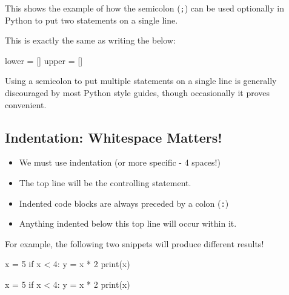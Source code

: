\documentclass[
  letterpaper,
  DIV=11,
  numbers=noendperiod]{scrartcl}
\newenvironment{Shaded}{\begin{snugshade}}{\end{snugshade}}
\newcommand{\BuiltInTok}[1]{\textcolor[rgb]{0.00,0.23,0.31}{#1}}
\newcommand{\ControlFlowTok}[1]{\textcolor[rgb]{0.00,0.23,0.31}{#1}}
\newcommand{\DecValTok}[1]{\textcolor[rgb]{0.68,0.00,0.00}{#1}}
\newcommand{\NormalTok}[1]{\textcolor[rgb]{0.00,0.23,0.31}{#1}}
\newcommand{\OperatorTok}[1]{\textcolor[rgb]{0.37,0.37,0.37}{#1}}
\begin{document}
This shows the example of how the semicolon (\texttt{;}) can be used
optionally in Python to put two statements on a single line.

This is exactly the same as writing the below:

\begin{Shaded}
\begin{Highlighting}[]
\NormalTok{lower }\OperatorTok{=}\NormalTok{ []}
\NormalTok{upper }\OperatorTok{=}\NormalTok{ []}
\end{Highlighting}
\end{Shaded}

Using a semicolon to put multiple statements on a single line is
generally discouraged by most Python style guides, though occasionally
it proves convenient.

\hypertarget{indentation-whitespace-matters}{%
\subsection{Indentation: Whitespace
Matters!}\label{indentation-whitespace-matters}}

\begin{itemize}
\item
  We must use indentation (or more specific - 4 spaces!)
\item
  The top line will be the controlling statement.
\item
  Indented code blocks are always preceded by a colon (\texttt{:})
\item
  Anything indented below this top line will occur within it.
\end{itemize}

For example, the following two snippets will produce different results!

\begin{Shaded}
\begin{Highlighting}[]
\NormalTok{x }\OperatorTok{=} \DecValTok{5}
\ControlFlowTok{if}\NormalTok{ x }\OperatorTok{\textless{}} \DecValTok{4}\NormalTok{:}
\NormalTok{    y }\OperatorTok{=}\NormalTok{ x }\OperatorTok{*} \DecValTok{2}
    \BuiltInTok{print}\NormalTok{(x)}
\end{Highlighting}
\end{Shaded}

\begin{Shaded}
\begin{Highlighting}[]
\NormalTok{x }\OperatorTok{=} \DecValTok{5}
\ControlFlowTok{if}\NormalTok{ x }\OperatorTok{\textless{}} \DecValTok{4}\NormalTok{:}
\NormalTok{    y }\OperatorTok{=}\NormalTok{ x }\OperatorTok{*} \DecValTok{2}
\BuiltInTok{print}\NormalTok{(x)}
\end{Highlighting}
\end{Shaded}
\end{document}
